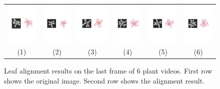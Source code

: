 \begin{figure}
\begin{centering}
\begin{tabular}{c c c c c c}
\includegraphics[width=.14\textwidth]{Figures/AlignPerformance/9_2}&
\includegraphics[width=.14\textwidth]{Figures/AlignPerformance/10_2}&
\includegraphics[width=.14\textwidth]{Figures/AlignPerformance/11_2}&
\includegraphics[width=.14\textwidth]{Figures/AlignPerformance/12_2}&
\includegraphics[width=.14\textwidth]{Figures/AlignPerformance/14_2}&
\includegraphics[width=.14\textwidth]{Figures/AlignPerformance/15_2}\\
(1) & (2) & (3) & (4) & (5) & (6) \\
\end{tabular}
\caption{Leaf alignment results on the last frame of $6$ plant videos. First row shows the original image. Second row shows the alignment result. }
\label{fig:alignResult}
\end{centering}
\end{figure}



